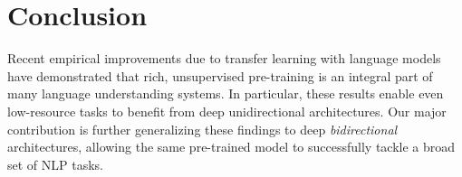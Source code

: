 \section{Conclusion}
Recent empirical improvements due to transfer learning with language models have demonstrated that rich, unsupervised pre-training is an integral part of many language understanding systems. In particular, these results enable even low-resource tasks to benefit from deep unidirectional architectures. Our major contribution is further generalizing these findings to deep \emph{bidirectional} architectures, allowing the same pre-trained model to successfully tackle a broad set of NLP tasks.
